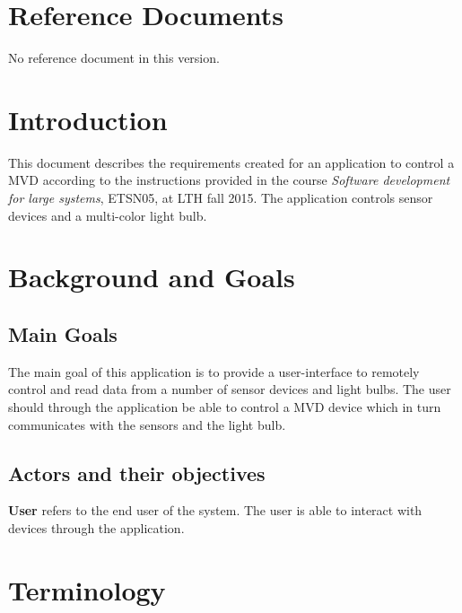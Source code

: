 \documentclass[a4paper]{article}
\begin{document}
\tableofcontents
\newpage
{}

\section{Reference Documents}
No reference document in this version.

\section{Introduction}
This document describes the requirements created for an application to control a MVD according to the instructions provided in the course \textit{Software development for large systems}, ETSN05, at LTH fall 2015.  The application controls sensor devices and a multi-color light bulb.

\section{Background and Goals}
\subsection{Main Goals}
The main goal of this application is to provide a user-interface to remotely control and read data from a number of sensor devices and light bulbs. The user should through the application be able to control a MVD device which in turn communicates with the sensors and the light bulb.
\subsection{Actors and their objectives}

\textbf{User} refers to the end user of the system. The user is able to interact with devices through the application. 

\section{Terminology}
\end{document}
